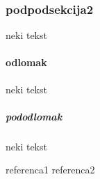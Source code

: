 \documentclass[a4paper,12pt]{article}
\begin{document}
\subsubsection{podpodsekcija2}
neki tekst
\paragraph{odlomak}
neki tekst
\subparagraph{pododlomak}
neki tekst




\begin{thebibliography}{99} %
 referenca1
 referenca2
\end{thebibliography}

\end{document}
